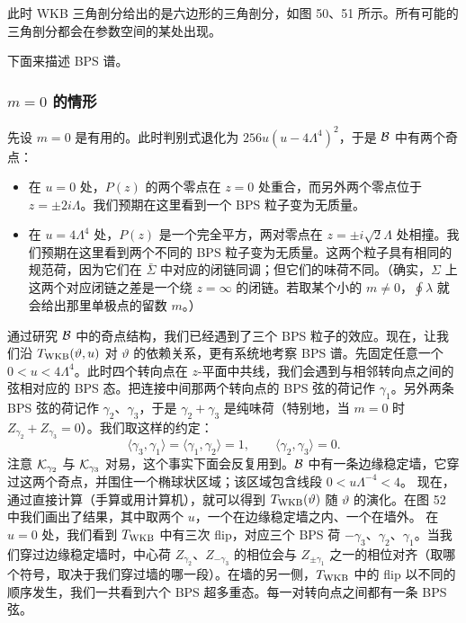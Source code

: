 此时 WKB 三角剖分给出的是六边形的三角剖分，如图 50、51 所示。所有可能的三角剖分都会在参数空间的某处出现。

下面来描述 BPS 谱。

\subsubsection*{$m=0$ 的情形}

先设 $m=0$ 是有用的。此时判别式退化为 $256 u(u - 4 \Lambda^4)^2$，于是 $\mathcal{B}$ 中有两个奇点：

\begin{itemize}
\item 在 $u=0$ 处，$P(z)$ 的两个零点在 $z=0$ 处重合，而另外两个零点位于 $z = \pm 2 i \Lambda$。我们预期在这里看到一个 BPS 粒子变为无质量。
\item 在 $u=4 \Lambda^4$ 处，$P(z)$ 是一个完全平方，两对零点在 $z=\pm i \sqrt{2} \Lambda$ 处相撞。我们预期在这里看到两个不同的 BPS 粒子变为无质量。这两个粒子具有相同的规范荷，因为它们在 $\bar\Sigma$ 中对应的闭链同调；但它们的味荷不同。（确实，$\Sigma$ 上这两个对应闭链之差是一个绕 $z = \infty$ 的闭链。若取某个小的 $m \neq 0$，$\oint \lambda$ 就会给出那里单极点的留数 $m$。）
\end{itemize}

通过研究 $\mathcal{B}$ 中的奇点结构，我们已经遇到了三个 BPS 粒子的效应。现在，让我们沿 $T_{\rm WKB}(\vartheta, u)$ 对 $\vartheta$ 的依赖关系，更有系统地考察 BPS 谱。先固定任意一个 $0 < u < 4 \Lambda^4$。此时四个转向点在 $z$-平面中共线，我们会遇到与相邻转向点之间的弦相对应的 BPS 态。把连接中间那两个转向点的 BPS 弦的荷记作 $\gamma_1$。另外两条 BPS 弦的荷记作 $\gamma_2$、$\gamma_3$，于是 $\gamma_2 + \gamma_3$ 是纯味荷（特别地，当 $m=0$ 时 $Z_{\gamma_2} + Z_{\gamma_3} = 0$）。我们取这样的约定：
\begin{equation}
\langle \gamma_3, \gamma_1 \rangle = \langle \gamma_1, \gamma_2 \rangle = 1,
\qquad \langle \gamma_2, \gamma_3 \rangle = 0.
\end{equation}
注意 $\mathcal{K}_{\gamma_2}$ 与 $\mathcal{K}_{\gamma_3}$ 对易，这个事实下面会反复用到。$\mathcal{B}$ 中有一条边缘稳定墙，它穿过这两个奇点，并围住一个椭球状区域；该区域包含线段 $0<u \Lambda^{-4} <4$。 现在，通过直接计算（手算或用计算机），就可以得到 $T_{\rm WKB}(\vartheta)$ 随 $\vartheta$ 的演化。在图 52 中我们画出了结果，其中取两个 $u$，一个在边缘稳定墙之内、一个在墙外。%
在 $u=0$ 处，我们看到 $T_{\rm WKB}$ 中有三次 flip，对应三个 BPS 荷 $-\gamma_3$、$\gamma_2$、$\gamma_1$。当我们穿过边缘稳定墙时，中心荷 $Z_{\gamma_2}$、$Z_{-\gamma_3}$ 的相位会与 $Z_{\pm \gamma_1}$ 之一的相位对齐（取哪个符号，取决于我们穿过墙的哪一段）。在墙的另一侧，$T_{\rm WKB}$ 中的 flip 以不同的顺序发生，我们一共看到六个 BPS 超多重态。每一对转向点之间都有一条 BPS 弦。

